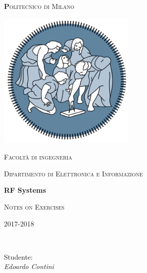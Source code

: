 \begin{titlepage}

	\centering
	{\scshape\Huge\textbf Politecnico di Milano \par}
	\vspace{0.5cm}

	\includegraphics[width=0.5\textwidth]{Immagini/logo.png}\par\vspace{0.2cm}
	
	{\scshape\small Facoltà di ingegneria\par}
	{\scshape\small Dipartimento di Elettronica e Informazione\par}
	\vspace{1.5cm}
	{\huge\bfseries RF Systems\par}
	\vspace{1.5cm}
	{\scshape Notes on Exercises\par}
	{\scshape\small 2017-2018 \par}
	\vspace{2cm}
	\vfill
    \\[1cm]
	
	\raggedright
    {Studente:\\ \textit{Edoardo Contini}
	
	}\vfill
	
	\end{titlepage}

